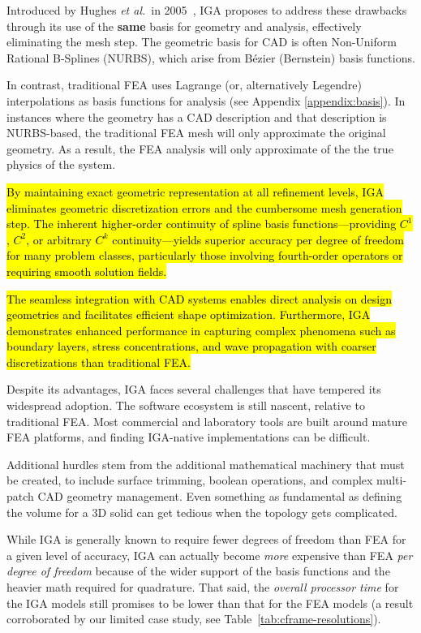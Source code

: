 \documentclass[12pt,report,justified]{SANDreport}
\begin{document}
Introduced by Hughes {\em et al.}~in 2005~\cite{Hughes2005Isogeometric},
IGA proposes to address these drawbacks through its use of the {\bf same} basis
for geometry and analysis, effectively eliminating the mesh step.
The geometric basis for CAD is often Non-Uniform Rational
B-Splines (NURBS), which arise from B{\'e}zier (Bernstein) basis functions.  

In contrast, traditional FEA uses Lagrange (or, alternatively Legendre) interpolations as 
basis functions for analysis (see Appendix \ref{appendix:basis}).  In instances where the geometry has a CAD description and 
that description is NURBS-based, the traditional FEA mesh will only approximate
the original geometry.  As a result, the FEA analysis will only approximate of the
the true physics of the system.

\hl{By maintaining exact geometric representation at all refinement levels, IGA eliminates geometric discretization errors and the cumbersome mesh generation step. The inherent higher-order continuity of spline basis functions—providing $C^1$, $C^2$, or arbitrary $C^k$ continuity—yields superior accuracy per degree of freedom for many problem classes, particularly those involving fourth-order operators or requiring smooth solution fields.}

\hl{The seamless integration with CAD systems enables direct analysis on design geometries and facilitates efficient shape optimization. Furthermore, IGA demonstrates enhanced performance in capturing complex phenomena such as boundary layers, stress concentrations, and wave propagation with coarser discretizations than traditional FEA.}

Despite its advantages, IGA faces several challenges that have tempered its widespread adoption.
The software ecosystem is still nascent, relative to traditional FEA. 
Most commercial and laboratory tools are built
around mature FEA platforms, and finding IGA-native implementations can be difficult.

Additional hurdles stem from the additional mathematical machinery that must be created,
to include surface trimming, boolean operations, and complex multi-patch CAD geometry management.
Even something as fundamental as defining the volume for a 3D solid can get tedious when
the topology gets complicated.

While IGA is generally known to require fewer degrees of freedom than FEA for a given
level of accuracy, IGA can actually become {\em more} expensive than FEA {\em per degree of freedom}
because of the wider support of the basis functions and the heavier math required for
quadrature. That said, the {\em overall processor time} for the IGA models still promises to be lower than that for the FEA models (a result corroborated by our limited case study, see Table~\ref{tab:cframe-resolutions}).
\end{document}
